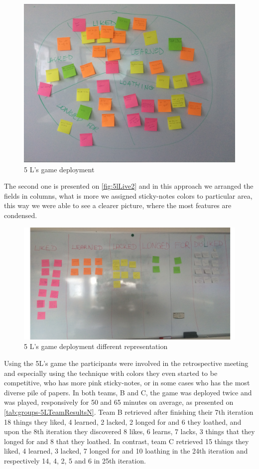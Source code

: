 \begin{figure}[!htbp]
\caption{5 L's game deployment}
\label{fig:5lLive}
\centering
\includegraphics[width=1\textwidth]{live/5lLive}
\end{figure}
The second one is presented on \autoref{fig:5lLive2} and in this approach we arranged the fields in columns, what is more we assigned sticky-notes colors to particular area, this way we were able to see a clearer picture, where the most features are condensed. 
\begin{figure}[!htbp]
\caption{5 L's game deployment different representation}
\label{fig:5lLive2}
\centering
\includegraphics[width=1\textwidth]{live/5lLive2}
\end{figure}

Using the 5L's game the participants were involved in the retrospective meeting and especially using the technique with colors they even started to be competitive, who has more pink sticky-notes, or in some cases who has the most diverse pile of papers. In both teams, B and C, the game was deployed twice and was played, responsively for 50 and 65 minutes on average, as presented on \autoref{tab:groups-5LTeamResultsN}. Team B retrieved after finishing their 7th iteration 18 things they liked, 4 learned, 2 lacked, 2 longed for and 6 they loathed, and upon the 8th iteration they discovered 8 likes, 6 learns, 7 lacks, 3 things that they longed for and 8 that they loathed. In contrast, team C retrieved 15 things they liked, 4 learned, 3 lacked, 7 longed for and 10 loathing in the 24th iteration and respectively 14, 4, 2, 5 and 6 in 25th iteration. 

